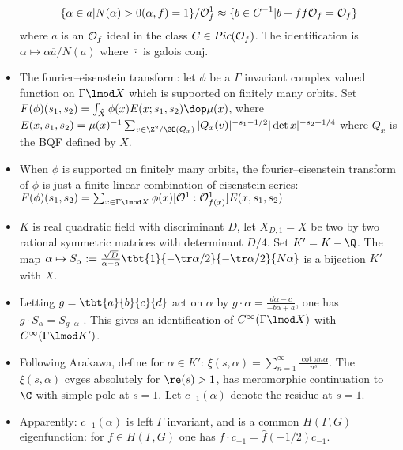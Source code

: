 \documentclass[11pt]{amsart}
\begin{document}
\begin{itemize}
\begin{align*}
			\{ \alpha \in a | N(\alpha)>0 (\alpha, f) =1 \} / \mathcal{O}_f^1 \approx \{b \in C^{-1} |b+f f\mathcal{O}_f=\mathcal{O}_f \}
		\end{align*}
		where $a$ is an $\mathcal{O}_f$ ideal in the  class  $C \in Pic(\mathcal{O}_f)$. The identification is $\alpha \mapsto \alpha \overline{a}/ N(a)$ where $\overline{\cdot}$ is galois conj. 
	\item The fourier--eisenstein transform: let $\phi$ be a $\Gamma$ invariant complex valued function on $\Gamma \lmod X$ which is supported on finitely many orbits. Set $F(\phi)(s_1,s_2) = \int_{\hat{X}} \phi(x) E(x;s_1,s_2) \dop \mu(x)$, where $E(x,s_1,s_2)=\mu(x)^{-1} \sum_{v\in \Z^2 /\SO(Q_x)} |Q_x(v)|^{-s_1 -1/2}|\det x| ^{-s_2+1/4}$ where $Q_x$ is the BQF defined by $X$. 
	\item When $\phi$ is supported on finitely many orbits, the fourier--eisenstein transform of $\phi$ is just a finite linear combination of eisenstein series: $F(\phi)(s_1,s_2)=\sum_{x \in \Gamma \lmod X} \phi(x) [\Order^1:\Order^1_{f(x)}] E(x,s_1,s_2)$
	\item $K$ is real quadratic field with discriminant $D$, let $X_{D,1}=X$ be two by two rational symmetric matrices with determinant $D/4$. Set $K'=K-\Q$. The map $\alpha \mapsto S_\alpha:=\frac{\sqrt{D}}{\alpha - \overline{\alpha}} \tbt{1}{-\tr \alpha/2}{-\tr \alpha /2}{N \alpha}$ is a bijection $K'$ with $X$.
	\item Letting $g=\tbt{a}{b}{c}{d}$ act on $\alpha$ by $g\cdot \alpha = \frac{d \alpha -c}{-b \alpha +a}$, one has $g\cdot S_\alpha = S_{g \cdot \alpha}$ . This gives an identification of $C^\infty (\Gamma \lmod X)$ with $C^\infty(\Gamma \lmod K')$. 
	\item Following Arakawa, define for $\alpha \in K'$: $\xi(s,\alpha)= \sum_{n=1}^\infty \frac{\cot \pi n \alpha}{n^s}$. The $\xi(s,\alpha)$ cvges absolutely for $\re(s)>1$, has meromorphic continuation to $\C$ with simple pole at $s=1$. Let $c_{-1}(\alpha)$ denote the residue at $s=1$. 
	\item Apparently: $c_{-1}(\alpha)$ is left $\Gamma$ invariant, and is a common $H(\Gamma,G)$ eigenfunction: for $f\in H(\Gamma,G)$ one has $f \cdot c_{-1} = \hat{f}(-1/2) c_{-1}$. 
\end{itemize}
\end{document}
